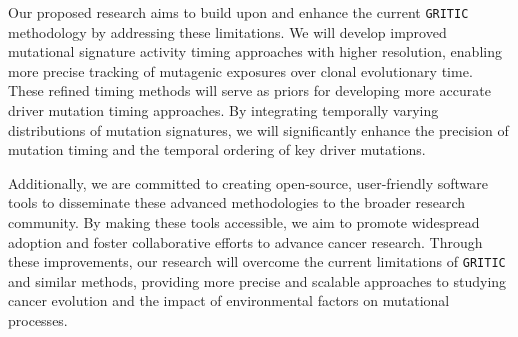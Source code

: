 \vspace{1em}
\noindent
Our proposed research aims to build upon and enhance the current \texttt{GRITIC} methodology by addressing these limitations. 
We will develop improved mutational signature activity timing approaches with higher resolution, 
enabling more precise tracking of mutagenic exposures over clonal evolutionary time. 
These refined timing methods will serve as priors for developing more accurate driver mutation timing approaches. 
By integrating temporally varying distributions of mutation signatures, 
we will significantly enhance the precision of mutation timing and the temporal ordering of key driver mutations.


\vspace{1em}
\noindent
Additionally, we are committed to creating open-source, user-friendly software tools to disseminate these advanced methodologies to the broader research community. 
By making these tools accessible, we aim to promote widespread adoption and foster collaborative efforts to advance cancer research.
Through these improvements, our research will overcome the current limitations of \texttt{GRITIC} and similar methods, 
providing more precise and scalable approaches to studying cancer evolution and the impact of environmental factors on mutational processes.

